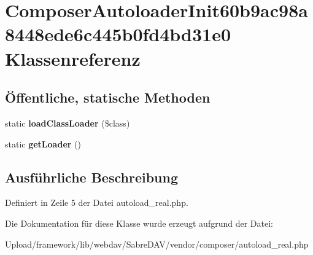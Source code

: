 \hypertarget{class_composer_autoloader_init60b9ac98a8448ede6c445b0fd4bd31e0}{}\section{Composer\+Autoloader\+Init60b9ac98a8448ede6c445b0fd4bd31e0 Klassenreferenz}
\label{class_composer_autoloader_init60b9ac98a8448ede6c445b0fd4bd31e0}
\subsection*{Öffentliche, statische Methoden}
\begin{DoxyCompactItemize}
\item 
\mbox{\label{class_composer_autoloader_init60b9ac98a8448ede6c445b0fd4bd31e0_a4ae2a8cb198c0efb1ef20cfb6dccbf54}} 
static {\bfseries load\+Class\+Loader} (\$class)
\item 
\mbox{\label{class_composer_autoloader_init60b9ac98a8448ede6c445b0fd4bd31e0_a976ff09ed495376eff09a94134e2adab}} 
static {\bfseries get\+Loader} ()
\end{DoxyCompactItemize}


\subsection{Ausführliche Beschreibung}


Definiert in Zeile 5 der Datei autoload\+\_\+real.\+php.



Die Dokumentation für diese Klasse wurde erzeugt aufgrund der Datei\+:\begin{DoxyCompactItemize}
\item 
Upload/framework/lib/webdav/\+Sabre\+D\+A\+V/vendor/composer/autoload\+\_\+real.\+php\end{DoxyCompactItemize}
